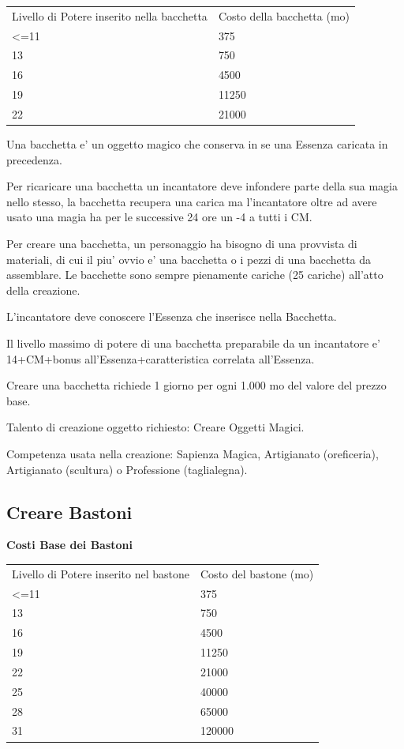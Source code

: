 \documentclass[a4paper,11pt,twoside,openany]{dndbook}
\begin{document}
{\begin{tabular}[c]{@{}ll@{}}
\toprule 
Livello di Potere inserito nella bacchetta & Costo della bacchetta (mo)\tabularnewline
\textless=11 & 375\tabularnewline
13 & 750\tabularnewline
16 & 4500\tabularnewline
19 & 11250\tabularnewline
22 & 21000\tabularnewline
\bottomrule
\end{tabular}

\bigskip

Una bacchetta e' un oggetto magico che conserva in se una Essenza caricata in precedenza.

Per ricaricare una bacchetta un incantatore deve infondere parte della sua magia nello stesso, la bacchetta recupera una carica ma l'incantatore oltre ad avere usato una magia ha per le successive 24 ore un -4 a tutti i CM.

Per creare una bacchetta, un personaggio ha bisogno di una provvista di materiali, di cui il piu' ovvio e' una bacchetta o i pezzi di una bacchetta da assemblare. Le bacchette sono sempre pienamente cariche (25 cariche) all'atto della creazione.

L'incantatore deve conoscere l'Essenza che inserisce nella Bacchetta.

Il livello massimo di potere di una bacchetta preparabile da un incantatore e' 14+CM+bonus all'Essenza+caratteristica correlata all'Essenza.

Creare una bacchetta richiede 1 giorno per ogni 1.000 mo del valore del prezzo base.

Talento di creazione oggetto richiesto: Creare Oggetti Magici.

Competenza usata nella creazione: Sapienza Magica, Artigianato (oreficeria),
Artigianato (scultura) o Professione (taglialegna).

\subsection{Creare Bastoni}

\textbf{Costi Base dei Bastoni}

\bigskip

\begin{tabular}[c]{@{}ll@{}}
\toprule 
Livello di Potere inserito nel bastone & Costo del bastone (mo)\tabularnewline
\textless=11 & 375\tabularnewline
13 & 750\tabularnewline
16 & 4500\tabularnewline
19 & 11250\tabularnewline
22 & 21000\tabularnewline
25 & 40000\tabularnewline
28 & 65000\tabularnewline
31 & 120000\tabularnewline
\bottomrule
\end{tabular}

}
\end{document}
